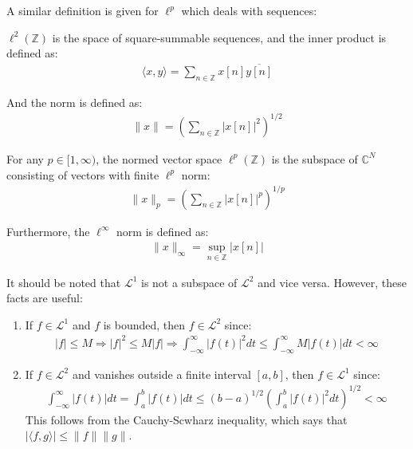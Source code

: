 A similar definition is given for $\ell^p$ which deals with sequences:
\begin{definition}
$\ell^2(\mathbb{Z})$ is the space of square-summable sequences, and the inner product is defined as:
\begin{align*}
\langle x,y \rangle = \sum_{n\in\mathbb{Z}} x[n] \overline{y[n]}
\end{align*}

And the norm is defined as:
\begin{align*}
\|x\| = \left( \sum_{n\in\mathbb{Z}} |x[n]|^2 \right)^{1/2}
\end{align*}

For any $p \in [1,\infty)$, the normed vector space $\ell^p(\mathbb{Z})$ is the subspace of $\mathbb{C}^N$ consisting of vectors with finite $\ell^p$ norm:
\begin{align*}
\|x\|_p = \left( \sum_{n\in\mathbb{Z}} |x[n]|^p \right)^{1/p}
\end{align*}

Furthermore, the $\ell^\infty$ norm is defined as:
\begin{align*}
\|x\|_\infty = \sup_{n\in\mathbb{Z}}|x[n]|
\end{align*}
\end{definition}

It should be noted that $\mathcal{L}^1$ is not a subspace of $\mathcal{L}^2$ and vice versa. However, these facts are useful:
\begin{enumerate}
\item If $f \in \mathcal{L}^1$ and $f$ is bounded, then $f \in \mathcal{L}^2$ since:
\begin{align*}
|f| \leq M \Rightarrow |f|^2 \leq M|f| \Rightarrow \int_{-\infty}^\infty |f(t)|^2 dt \leq \int_{-\infty}^\infty M|f(t)| dt < \infty
\end{align*}
\item If $f \in \mathcal{L}^2$ and vanishes outside a finite interval $[a,b]$, then $f \in \mathcal{L}^1$ since: 
\begin{align*}
\int_{-\infty}^\infty |f(t)| dt = \int_a^b |f(t)| dt \leq (b - a)^{1/2} \left( \int_a^b |f(t)|^2 dt \right)^{1/2} < \infty
\end{align*}
This follows from the Cauchy-Scwharz inequality, which says that $|\langle f,g \rangle| \leq \|f\| \|g\|$.
\end{enumerate}



